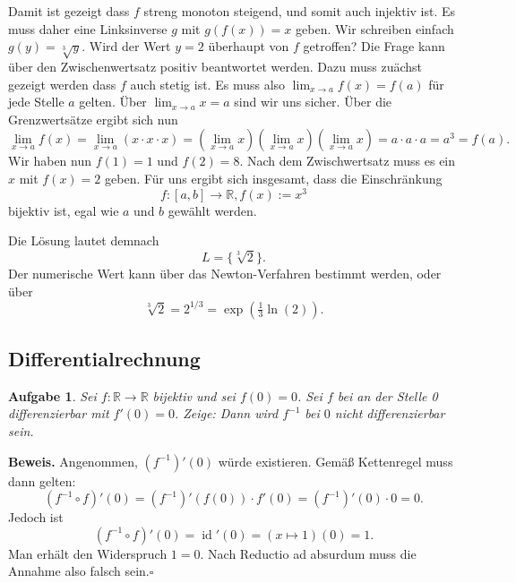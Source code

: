 \documentclass[a4paper,10pt,fleqn,twoside]{scrartcl}
\numberwithin{equation}{section}
\newcommand{\R}{\mathbb R}
\newcommand{\strong}[1]{{\normalfont\sffamily\bfseries #1}}
\renewcommand{\qedsymbol}{\ensuremath{\square}}
\theoremstyle{Aufgabe}
\newtheorem{Aufgabe}{\sffamily Aufgabe}[section]
\begin{document}
Damit ist gezeigt dass $f$ streng monoton steigend, und somit auch
injektiv ist. Es muss daher eine Linksinverse $g$ mit $g(f(x))=x$
geben. Wir schreiben einfach $g(y)=\sqrt[3]{y}$.
Wird der Wert $y=2$ überhaupt von $f$ getroffen? Die Frage kann
über den Zwischenwertsatz positiv beantwortet werden. Dazu muss
zuächst gezeigt werden dass $f$ auch stetig ist. Es muss also
$\lim_{x\to a}f(x)=f(a)$ für jede Stelle $a$ gelten. Über
$\lim_{x\to a} x = a$ sind wir uns sicher. Über die Grenzwertsätze ergibt
sich nun
\begin{equation}
\lim_{x\to a} f(x) = \lim_{x\to a} (x\cdot x\cdot x)
= (\lim_{x\to a} x)(\lim_{x\to a} x)(\lim_{x\to a} x)
= a\cdot a\cdot a = a^3 = f(a).
\end{equation}
Wir haben nun $f(1)=1$ und $f(2)=8$. Nach dem Zwischwertsatz
muss es ein $x$ mit $f(x)=2$ geben. Für uns ergibt sich insgesamt, dass
die Einschränkung
\begin{equation}
f\colon [a,b]\to\R, f(x):=x^3
\end{equation}
bijektiv ist, egal wie $a$ und $b$ gewählt werden.

Die Lösung lautet demnach
\begin{equation}
L = \{\sqrt[3]{2}\}.
\end{equation}
Der numerische Wert kann über das Newton-Verfahren bestimmt werden,
oder über
\begin{equation}
\sqrt[3]{2} = 2^{1/3} = \exp(\tfrac{1}{3}\ln(2)).
\end{equation}

\subsection{Differentialrechnung}
\begin{Aufgabe}
Sei $f\colon\R\to\R$ bijektiv und sei $f(0)=0$. Sei $f$ bei an der
Stelle 0 differenzierbar mit $f'(0)=0$. Zeige: Dann wird $f^{-1}$
bei $0$ nicht differenzierbar sein.
\end{Aufgabe}
\strong{Beweis.} Angenommen, $(f^{-1})'(0)$ würde existieren. Gemäß
Kettenregel muss dann gelten:
\begin{equation}
(f^{-1}\circ f)'(0) = (f^{-1})'(f(0))\cdot f'(0) = (f^{-1})'(0)\cdot 0 = 0.
\end{equation}
Jedoch ist
\begin{equation}
(f^{-1}\circ f)'(0) = \operatorname{id}'(0) = (x\mapsto 1)(0) = 1.
\end{equation}
Man erhält den Widerspruch $1=0$. Nach Reductio ad absurdum muss
die Annahme also falsch sein.\;\qedsymbol
\end{document}
